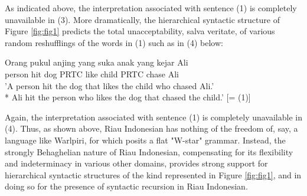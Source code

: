 \documentclass[output=paper,colorlinks,citecolor=brown
]{langscibook}
\begin{document}
As indicated above, the interpretation associated with sentence (1) is completely unavailable in (3).  More dramatically, the hierarchical syntactic structure of Figure \ref{fig:fig1} predicts the total unacceptability, salva veritate, of various random reshufflings of the words in (1) such as in (4) below:  

\ea
\gll Orang	pukul	anjing	yang	suka	anak	yang	kejar	Ali \\
    person	hit	dog	PRTC	like	child	PRTC	chase	Ali\\
\glt 		'A person hit the dog that likes the child who chased Ali.' \\
*	Ali hit the person who likes the dog that chased the child.' [= (1)]
\z

Again, the interpretation associated with sentence (1) is completely unavailable in (4).  Thus, as shown above, Riau Indonesian has nothing of the freedom of, say, a language like Warlpiri, for which \citet{hale1979position, hale1983warlpiri} posits a flat "W-star" grammar. Instead, the strongly Behaghelian nature of Riau Indonesian, compensating for its flexibility and indeterminacy in various other domains, provides strong support for hierarchical syntactic structures of the kind represented in Figure \ref{fig:fig1}, and in doing so for the presence of syntactic recursion in Riau Indonesian.
\end{document}
